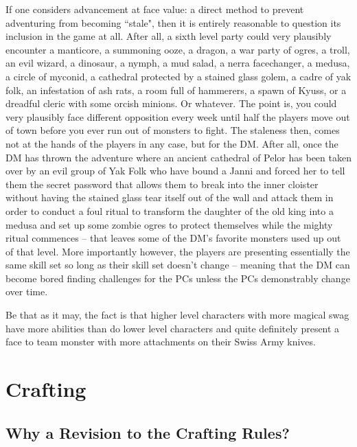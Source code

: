 If one considers advancement at face value: a direct method to prevent adventuring from becoming ``stale", then it is entirely reasonable to question its inclusion in the game at all. After all, a sixth level party could very plausibly encounter a manticore, a summoning ooze, a dragon, a war party of ogres, a troll, an evil wizard, a dinosaur, a nymph, a mud salad, a nerra facechanger, a medusa, a circle of myconid, a cathedral protected by a stained glass golem, a cadre of yak folk, an infestation of ash rats, a room full of hammerers, a spawn of Kyuss, or a dreadful cleric with some orcish minions. Or whatever. The point is, you could very plausibly face different opposition every week until half the players move out of town before you ever run out of monsters to fight. The staleness then, comes not at the hands of the players in any case, but for the DM. After all, once the DM has thrown the adventure where an ancient cathedral of Pelor has been taken over by an evil group of Yak Folk who have bound a Janni and forced her to tell them the secret password that allows them to break into the inner cloister without having the stained glass tear itself out of the wall and attack them in order to conduct a foul ritual to transform the daughter of the old king into a medusa and set up some zombie ogres to protect themselves while the mighty ritual commences -- that leaves some of the DM's favorite monsters used up out of that level. More importantly however, the players are presenting essentially the same skill set so long as their skill set doesn't change -- meaning that the DM can become bored finding challenges for the PCs unless the PCs demonstrably change over time.

Be that as it may, the fact is that higher level characters with more magical swag have more abilities than do lower level characters and quite definitely present a face to team monster with more attachments on their Swiss Army knives.


\section{Crafting}

\subsection{Why a Revision to the Crafting Rules?}

